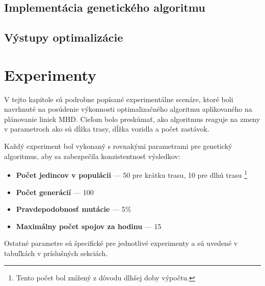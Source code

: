 \section{Implementácia genetického algoritmu}


\section{Výstupy optimalizácie}

















































\chapter{Experimenty} %
\label{experimenty}

V tejto kapitole sú podrobne popísané experimentálne scenáre, ktoré boli navrhnuté na posúdenie výkonnosti optimalizačného algoritmu aplikovaného na plánovanie liniek MHD.
Cieľom bolo preskúmať, ako algoritmus reaguje na zmeny v parametroch ako sú dĺžka trasy, dĺžka vozidla a počet zastávok.

Každý experiment bol vykonaný s rovnakými parametrami pre genetický algoritmus, aby sa zabezpečila konzistentnosť výsledkov:
\begin{itemize}
  \item \textbf{Počet jedincov v populácii} --- 50 pre krátku trasu, 10 pre dlhú trasu \footnote{Tento počet bol znížený z dôvodu dlhšej doby výpočtu.}
  \item \textbf{Počet generácií} --- 100
  \item \textbf{Pravdepodobnosť mutácie} --- 5\%
  \item \textbf{Maximálny počet spojov za hodinu} --- 15
\end{itemize}
Ostatné parametre sú špecifické pre jednotlivé experimenty a sú uvedené v tabuľkách v príslušných sekciách.

